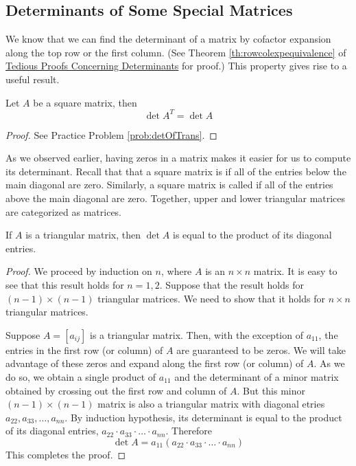 \documentclass{ximera}
\begin{document}
\subsection*{Determinants of Some Special Matrices}
We know that we can find the determinant of a matrix by cofactor expansion along the top row or the first column.  (See Theorem \ref{th:rowcolexpequivalence} of \href{\xmbaseurl/DET-0050/main}{Tedious Proofs Concerning Determinants} for proof.)  This property gives rise to a useful result.
\begin{theorem}\label{th:detoftrans}
Let $A$ be a square matrix, then
$$\det{A^T}=\det{A}$$
\end{theorem}
\begin{proof}
    See Practice Problem \ref{prob:detOfTrans}.
\end{proof}

As we observed earlier, having zeros in a matrix makes it easier for us to compute its determinant.  Recall that that a square matrix is  if all of the entries below the main diagonal are zero.  Similarly, a square matrix is called  if all of the entries above the main diagonal are zero.  Together, upper and lower triangular matrices are categorized as  matrices.

\begin{theorem}\label{lemma:triangulardet}
If $A$ is a triangular matrix, then $\det{A}$ is equal to the product of its diagonal entries.
\end{theorem}
\begin{proof}
We proceed by induction on $n$, where $A$ is an $n\times n$ matrix.  It is easy to see that this result holds for $n=1, 2$.  Suppose that the result holds for $(n-1)\times (n-1)$ triangular matrices.  We need to show that it holds for $n\times n$ triangular matrices.  

Suppose $A=[a_{ij}]$ is a triangular matrix. Then, with the exception of $a_{11}$, the entries in the first row (or column) of $A$ are guaranteed to be zeros.
  We will take advantage of these zeros and expand along the first row (or column) of $A$.  As we do so, we obtain a single product of $a_{11}$ and the determinant of a minor matrix obtained by crossing out the first row and column of $A$.  But this minor $(n-1)\times (n-1)$ matrix is also a triangular matrix with diagonal etries $a_{22}, a_{33},\ldots, a_{nn}$.  By induction hypothesis, its determinant is equal to the product of its diagonal entries, $a_{22}\cdot a_{33}\cdot\ldots\cdot a_{nn}$.  Therefore $$\det{A}=a_{11}(a_{22}\cdot a_{33}\cdot\ldots\cdot a_{nn})$$
 This completes the proof.
\end{proof}
\end{document}
